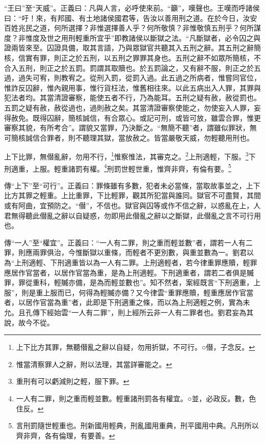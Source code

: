 {\noindent\shu{}\fzkt “王曰”至“天威”。正義曰：凡與人言，必呼使來前。“籲”，嘆聲也。王嘆而呼諸侯曰：“吁！來，有邦國、有土地諸侯國君等，告汝以善用刑之道。在於今日，汝安百姓兆民之道，何所選擇？非惟選擇善人乎？何所敬慎？非惟敬慎五刑乎？何所謀度？非惟度及世之用刑輕重所宜乎”即教諸侯以斷獄之法。“凡斷獄者，必令囚之與證兩皆來至。囚證具備，取其言語，乃與眾獄官共聽其入五刑之辭。其五刑之辭簡核，信實有罪，則正之於五刑，以五刑之罪罪其身也。五刑之辭不如眾所簡核，不合入五刑，則正之於五罰。罰謂其取贖也。於五罰論之，又有辭不服，則正之於五過，過失可宥，則教宥之。從刑入罰，從罰入過。此五過之所病者，惟嘗同官位，惟詐反囚辭，惟內親用事，惟行貨枉法，惟舊相往來。以此五病出入人罪，其罪與犯法者均。其當清證審察，能使五者不行，乃為能耳。五刑之疑有赦，赦從罰也。五罰之疑有赦，赦從過也，過則赦之矣。其當清證審察使能之，勿使妄入人罪，妄得赦免。既得囚辭，簡核誠信，有合眾心。或記可刑，或皆可放，雖雲合罪，惟更審察其貌，有所考合”。謂貌又當罪，乃決斷之。“無簡不聽”者，謂雖似罪狀，無可簡核誠信合罪者，則不聽理其獄，當放赦之。皆當嚴敬天威，勿輕聽用刑也。 \par}

上下比罪，無僣亂辭，勿用不行，\footnote{上下比方其罪，無聽僣亂之辭以自疑，勿用折獄，不可行。○僣，子念反。}惟察惟法，其審克之。\footnote{惟當清察罪人之辭，附以法理，其當詳審能之。}上刑適輕，下服。\footnote{重刑有可以虧減則之輕，服下罪。}下刑適重，上服。輕重諸罰有權。\footnote{一人有二罪，則之重而輕並數。輕重諸刑罰各有權宜。○並，必政反。數，色住反。}刑罰世輕世重，惟齊非齊，有倫有要。\footnote{言刑罰隨世輕重也。刑新國用輕典，刑亂國用重典，刑平國用中典。凡刑所以齊非齊，各有倫理，有要善。}


{\noindent\zhuan{}\fzbyks 傳“上下”至“可行”。正義曰：罪條雖有多數，犯者未必當條，當取故事並之，上下比方其罪之輕重。上比重罪，下比輕罪，觀其所犯當與誰同。獄官不可盡賢，其間或有阿曲，宜預防之。“僣”，不信也。獄官與囚等或作不信之辭，以惑亂在上，人君無得聽此僣亂之辭以自疑惑，勿即用此僣亂之辭以之斷獄，此僣亂之言不可行用也。 \par}

{\noindent\zhuan{}\fzbyks 傳“一人”至“權宜”。正義曰：“一人有二罪，則之重而輕並數”者，謂若一人有二罪，則應兩罪俱治，今惟斷獄以重條，而輕者不更別數，與重並數為一。劉君以為“上刑適輕、下刑適重皆以為一人有二罪。上刑適輕者，若今律重罪應贖，輕罪應居作官當者，以居作官當為重，是為上刑適輕。下刑適重者，謂若二者俱是贓罪，罪從重科，輕贓亦備，是為而輕並數也”。知不然者，案經既言“下刑適重，上服”，則是重上服而已，何得為輕贓亦備？又今律雲“重罪應贖，輕重應居作官當者，以居作官當為重”者，此即是下刑適重之條，而以為上刑適輕之例，實為未允。且孔傳下經始雲“一人有二罪”，則上經所云非一人有二罪者也。劉君妄為其說，故今不從。 \par}

